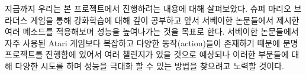 지금까지 우리는 본 프로젝트에서 진행하려는 내용에 대해 살펴보았다. 
슈퍼 마리오 브라더스 게임을 통해 강화학습에 대해 깊이 공부하고 앞서 서베이한 논문들에서 제시한 여러 메소드를 적용해보며 성능을 높여나가는 것을 목표로 한다. 
서베이한 논문들에서 자주 사용된 Atari 게임보다 복잡하고 다양한 동작(action)들이 존재하기 때문에 분명 프로젝트를 진행함에 있어서 여러 챌린지가 있을 것으로 예상되나 이러한 부분들에 대해 다양한 시도를 하며 성능을 극대화 할 수 있는 방법을 찾으려고 노력할 것이다.
